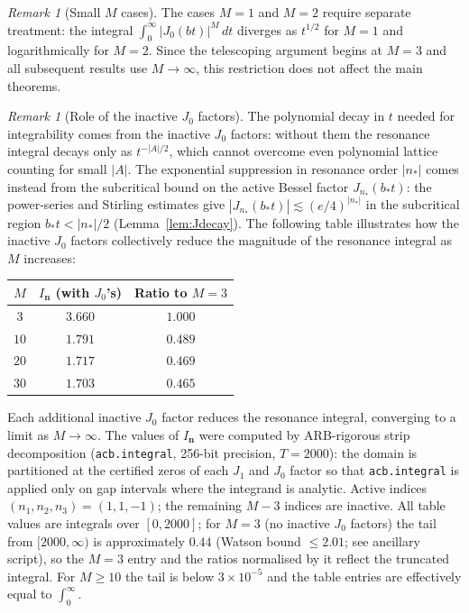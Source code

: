 \documentclass[12pt,reqno]{amsart}
\theoremstyle{plain}
\theoremstyle{definition}
\theoremstyle{remark}
\newtheorem{remark}[theorem]{Remark}
\begin{document}
\begin{remark}[Small $M$ cases]\label{rem:smallM}
The cases $M = 1$ and $M = 2$ require separate treatment: the integral $\int_0^\infty |J_0(bt)|^M\, dt$ diverges as $t^{1/2}$ for $M = 1$ and logarithmically for $M = 2$.  Since the telescoping argument begins at $M = 3$ and all subsequent results use $M \to \infty$, this restriction does not affect the main theorems.
\end{remark}

\begin{remark}[Role of the inactive $J_0$ factors]\label{rem:J0role}
The polynomial decay in $t$ needed for integrability comes from the inactive $J_0$ factors: without them the resonance integral decays only as $t^{-|A|/2}$, which cannot overcome even polynomial lattice counting for small $|A|$.  The exponential suppression in resonance order $|n_*|$ comes instead from the subcritical bound on the active Bessel factor $J_{n_*}(b_* t)$: the power-series and Stirling estimates give $|J_{n_*}(b_* t)| \lesssim (e/4)^{|n_*|}$ in the subcritical region $b_* t < |n_*|/2$ (Lemma~\ref{lem:Jdecay}).  The following table illustrates how the inactive $J_0$ factors collectively reduce the magnitude of the resonance integral as $M$ increases:
\begin{center}
\renewcommand{\arraystretch}{1.1}
\begin{tabular}{ccc}
\toprule
$M$ & $I_{\mathbf{n}}$ (with $J_0$'s) & Ratio to $M=3$ \\
\midrule
$3$ & $3.660$ & $1.000$ \\
$10$ & $1.791$ & $0.489$ \\
$20$ & $1.717$ & $0.469$ \\
$30$ & $1.703$ & $0.465$ \\
\bottomrule
\end{tabular}
\end{center}
Each additional inactive $J_0$ factor reduces the resonance integral, converging to a limit as $M \to \infty$.  The values of $I_{\mathbf{n}}$ were computed by ARB-rigorous strip decomposition (\texttt{acb.integral}, 256-bit precision, $T = 2000$): the domain is partitioned at the certified zeros of each $J_1$ and $J_0$ factor so that \texttt{acb.integral} is applied only on gap intervals where the integrand is analytic.  Active indices $(n_1, n_2, n_3) = (1, 1, -1)$; the remaining $M - 3$ indices are inactive. All table values are integrals over $[0, 2000]$; for $M = 3$ (no inactive $J_0$ factors) the tail from $[2000, \infty)$ is approximately $0.44$ (Watson bound $\leq 2.01$; see ancillary script), so the $M = 3$ entry and the ratios normalised by it reflect the truncated integral.  For $M \geq 10$ the tail is below $3 \times 10^{-5}$ and the table entries are effectively equal to $\int_0^\infty$.
\end{remark}
\end{document}
